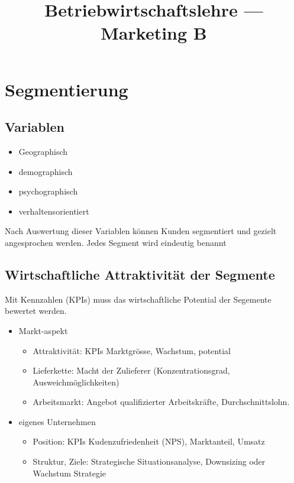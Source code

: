 \documentclass[a4paper]{article}
\title{\textbf{Betriebwirtschaftslehre — Marketing B}}
\begin{document}
    \maketitle
    \section{Segmentierung}
    
    \subsection{Variablen}
    \begin{itemize}
        \item Geographisch
        \item demographisch
        \item psychographisch
        \item verhaltensorientiert
    \end{itemize}
    Nach Auswertung dieser Variablen können Kunden segmentiert und gezielt angesprochen werden. Jedes Segment wird eindeutig benannt

    \subsection{Wirtschaftliche Attraktivität der Segmente}
    Mit Kennzahlen (KPIs) muss das wirtschaftliche Potential der Segemente bewertet werden.
    \begin{itemize}
        \item Markt-aspekt
        \begin{itemize}
            \item Attraktivität: KPIs Marktgrösse, Wachstum, potential
            \item Lieferkette: Macht der Zulieferer (Konzentrationsgrad, Ausweichmöglichkeiten)
            \item Arbeitsmarkt: Angebot qualifizierter Arbeitskräfte, Durchschnittslohn. 
        \end{itemize}
        \item eigenes Unternehmen 
        \begin{itemize}
            \item Position: KPIs Kudenzufriedenheit (NPS), Marktanteil, Umsatz
            \item Struktur, Ziele: Strategische Situationsanalyse, Downsizing oder Wachstum Strategie
        \end{itemize}
    \end{itemize}
    \pagebreak
\end{document}
